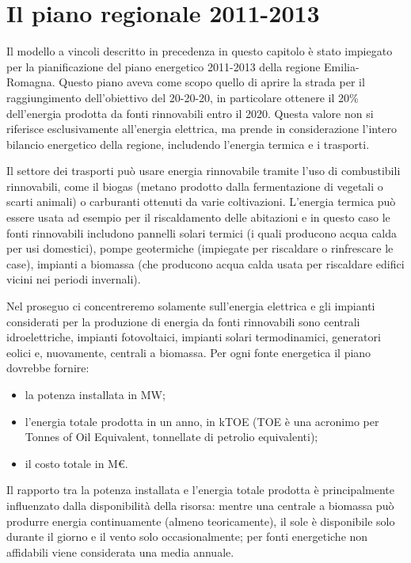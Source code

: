 \section{Il piano regionale 2011-2013}
Il modello a vincoli descritto in precedenza in questo capitolo è stato impiegato per la pianificazione del piano energetico 2011-2013 della regione Emilia-Romagna. Questo piano aveva come scopo quello di aprire la strada per il raggiungimento dell'obiettivo del 20-20-20, in particolare ottenere il 20\% dell'energia prodotta da fonti rinnovabili entro il 2020. Questa valore non si riferisce esclusivamente all'energia elettrica, ma prende in considerazione l'intero bilancio energetico della regione, includendo l'energia termica e i trasporti. 

Il settore dei trasporti può usare energia rinnovabile tramite l'uso di combustibili rinnovabili, come il biogas (metano prodotto dalla fermentazione di vegetali o scarti animali) o carburanti ottenuti da varie coltivazioni. L'energia termica può essere usata ad esempio per il riscaldamento delle abitazioni e in questo caso le fonti rinnovabili includono pannelli solari termici (i quali producono acqua calda per usi domestici), pompe geotermiche (impiegate per riscaldare o rinfrescare le case), impianti a biomassa (che producono acqua calda usata per riscaldare edifici vicini nei periodi invernali). 

Nel proseguo ci concentreremo solamente sull'energia elettrica e gli impianti considerati per la produzione di energia da fonti rinnovabili sono centrali idroelettriche, impianti fotovoltaici, impianti solari termodinamici, generatori eolici e, nuovamente, centrali a biomassa. Per ogni fonte energetica il piano dovrebbe fornire:
\begin{itemize}
\item la potenza installata in MW;
\item l'energia totale prodotta in un anno, in kTOE (TOE è una acronimo per Tonnes of Oil Equivalent, tonnellate di petrolio equivalenti);
\item il costo totale in M\euro.
\end{itemize} 
Il rapporto tra la potenza installata e l'energia totale prodotta è principalmente influenzato dalla disponibilità della risorsa: mentre una centrale a biomassa può produrre energia continuamente (almeno teoricamente), il sole è disponibile solo durante il giorno e il vento solo occasionalmente; per fonti energetiche non affidabili viene considerata una media annuale. 

